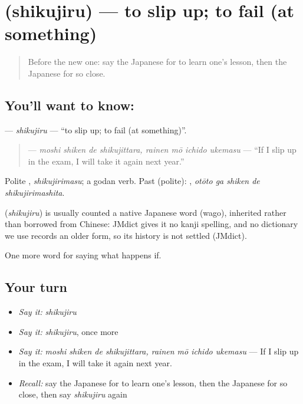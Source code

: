 \section[\texorpdfstring{\ja{しくじる} (shikujiru)}{しくじる (shikujiru)}]{ (shikujiru) — to slip up; to fail (at something)}

\label{lesson:JA-C518-shikujiru}



\begin{quote}
Before the new one: say the Japanese for to learn one's lesson, then the Japanese for so close.
\end{quote}

\subsection*{You'll want to know: }
\textbf{} — \emph{shikujiru} — \textquotedblleft{}to slip up; to fail (at something)\textquotedblright{}.

\begin{quote}
\textbf{     } — \emph{moshi shiken de shikujittara, rainen mō ichido ukemasu} — \textquotedblleft{}If I slip up in the exam, I will take it again next year.\textquotedblright{}
\end{quote}

Polite \textbf{}, \emph{shikujirimasu}; a godan verb. Past (polite): \textbf{  }, \emph{otōto ga shiken de shikujirimashita}.

\begin{cousinweb}
\textbf{} (\emph{shikujiru}) is usually counted a native Japanese word (wago), inherited rather than borrowed from Chinese: JMdict gives it no kanji spelling, and no dictionary we use records an older form, so its history is not settled (JMdict).
\end{cousinweb}

\begin{grammarlens}[title={What you've built}]
One more word for saying what happens if.
\end{grammarlens}

\subsection*{Your turn}
\begin{itemize}
\raggedright
  \item \emph{Say it:} \emph{shikujiru}
  \item \emph{Say it:} \emph{shikujiru}, once more
  \item \emph{Say it:} \emph{moshi shiken de shikujittara, rainen mō ichido ukemasu} — If I slip up in the exam, I will take it again next year.
  \item \emph{Recall:} say the Japanese for to learn one's lesson, then the Japanese for so close, then say \emph{shikujiru} again
\end{itemize}

